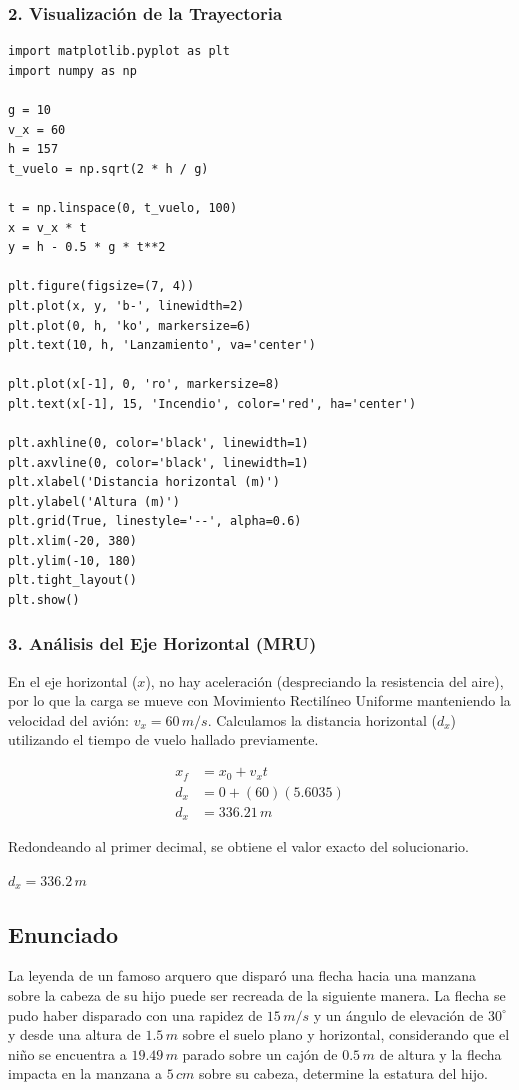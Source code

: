 \documentclass[12pt, a4paper]{article}
\begin{document}
\subsubsection*{2. Visualización de la Trayectoria}
\begin{verbatim}
import matplotlib.pyplot as plt
import numpy as np

g = 10
v_x = 60
h = 157
t_vuelo = np.sqrt(2 * h / g)

t = np.linspace(0, t_vuelo, 100)
x = v_x * t
y = h - 0.5 * g * t**2

plt.figure(figsize=(7, 4))
plt.plot(x, y, 'b-', linewidth=2)
plt.plot(0, h, 'ko', markersize=6)
plt.text(10, h, 'Lanzamiento', va='center')

plt.plot(x[-1], 0, 'ro', markersize=8)
plt.text(x[-1], 15, 'Incendio', color='red', ha='center')

plt.axhline(0, color='black', linewidth=1)
plt.axvline(0, color='black', linewidth=1)
plt.xlabel('Distancia horizontal (m)')
plt.ylabel('Altura (m)')
plt.grid(True, linestyle='--', alpha=0.6)
plt.xlim(-20, 380)
plt.ylim(-10, 180)
plt.tight_layout()
plt.show()
\end{verbatim}

\subsubsection*{3. Análisis del Eje Horizontal (MRU)}
En el eje horizontal ($x$), no hay aceleración (despreciando la resistencia del aire), por lo que la carga se mueve con Movimiento Rectilíneo Uniforme manteniendo la velocidad del avión: $v_x = 60 \, \si{m/s}$.
Calculamos la distancia horizontal ($d_x$) utilizando el tiempo de vuelo hallado previamente.

\begin{align*}
x_f &= x_0 + v_xt \\
d_x &= 0 + (60)(5.6035) \\
d_x &= 336.21 \, \si{m}
\end{align*}

Redondeando al primer decimal, se obtiene el valor exacto del solucionario.

\begin{tcolorbox}[colback=green!5!white, colframe=green!50!black, title=Respuesta Final]
\centering \Large $d_x = 336.2 \, \si{m}$
\end{tcolorbox}

\newpage

\subsection*{Enunciado}
La leyenda de un famoso arquero que disparó una flecha hacia una manzana sobre la cabeza de su hijo puede ser recreada de la siguiente manera. La flecha se pudo haber disparado con una rapidez de $15 \, \si{m/s}$ y un ángulo de elevación de $30^\circ$ y desde una altura de $1.5 \, \si{m}$ sobre el suelo plano y horizontal, considerando que el niño se encuentra a $19.49 \, \si{m}$ parado sobre un cajón de $0.5 \, \si{m}$ de altura y la flecha impacta en la manzana a $5 \, \si{cm}$ sobre su cabeza, determine la estatura del hijo.
\end{document}
